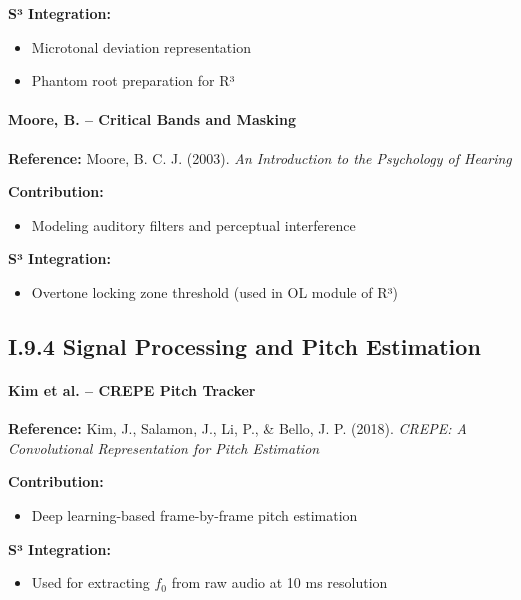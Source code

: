 \textbf{S³ Integration:}

\begin{itemize}
    \item Microtonal deviation representation
    \item Phantom root preparation for R³
\end{itemize}

\paragraph{Moore, B. – Critical Bands and Masking}

\textbf{Reference:} Moore, B. C. J. (2003). \textit{An Introduction to the Psychology of Hearing}

\textbf{Contribution:}

\begin{itemize}
    \item Modeling auditory filters and perceptual interference
\end{itemize}

\textbf{S³ Integration:}

\begin{itemize}
    \item Overtone locking zone threshold (used in OL module of R³)
\end{itemize}

\subsection*{I.9.4 Signal Processing and Pitch Estimation}

\paragraph{Kim et al. – CREPE Pitch Tracker}

\textbf{Reference:} Kim, J., Salamon, J., Li, P., \& Bello, J. P. (2018). \textit{CREPE: A Convolutional Representation for Pitch Estimation}

\textbf{Contribution:}

\begin{itemize}
    \item Deep learning-based frame-by-frame pitch estimation
\end{itemize}

\textbf{S³ Integration:}

\begin{itemize}
    \item Used for extracting $f_0$ from raw audio at 10 ms resolution
\end{itemize}

